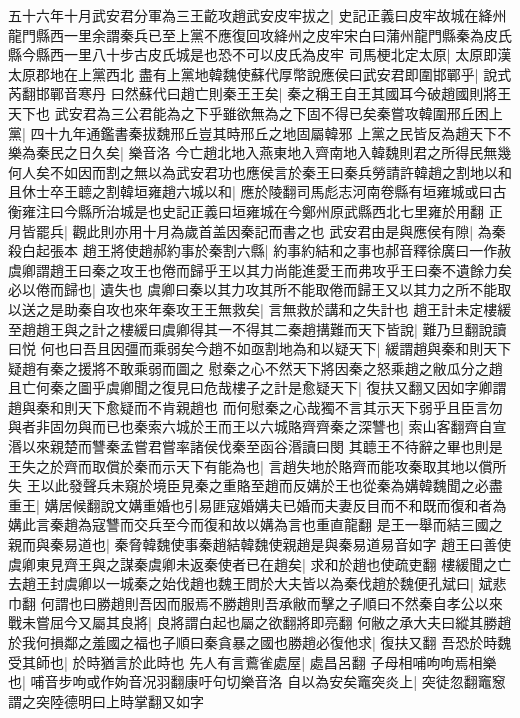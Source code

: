 五十六年十月武安君分軍為三王齕攻趙武安皮牢拔之|{
	史記正義曰皮牢故城在絳州龍門縣西一里余謂秦兵已至上黨不應復回攻絳州之皮牢宋白曰蒲州龍門縣秦為皮氏縣今縣西一里八十步古皮氏城是也恐不可以皮氏為皮牢}
司馬梗北定太原|{
	太原即漢太原郡地在上黨西北}
盡有上黨地韓魏使蘇代厚幣說應侯曰武安君即圍邯鄲乎|{
	說式芮翻邯鄲音寒丹}
曰然蘇代曰趙亡則秦王王矣|{
	秦之稱王自王其國耳今破趙國則將王天下也}
武安君為三公君能為之下乎雖欲無為之下固不得已矣秦嘗攻韓圍邢丘困上黨|{
	四十九年通鑑書秦拔魏邢丘豈其時邢丘之地固屬韓邪}
上黨之民皆反為趙天下不樂為秦民之日久矣|{
	樂音洛}
今亡趙北地入燕東地入齊南地入韓魏則君之所得民無幾何人矣不如因而割之無以為武安君功也應侯言於秦王曰秦兵勞請許韓趙之割地以和且休士卒王聼之割韓垣雍趙六城以和|{
	應於陵翻司馬彪志河南卷縣有垣雍城或曰古衡雍注曰今縣所治城是也史記正義曰垣雍城在今鄭州原武縣西北七里雍於用翻}
正月皆罷兵|{
	觀此則亦用十月為歲首盖因秦記而書之也}
武安君由是與應侯有隙|{
	為秦殺白起張本}
趙王將使趙郝約事於秦割六縣|{
	約事約結和之事也郝音釋徐廣曰一作赦}
虞卿謂趙王曰秦之攻王也倦而歸乎王以其力尚能進愛王而弗攻乎王曰秦不遺餘力矣必以倦而歸也|{
	遺失也}
虞卿曰秦以其力攻其所不能取倦而歸王又以其力之所不能取以送之是助秦自攻也來年秦攻王王無救矣|{
	言無救於講和之失計也}
趙王計未定樓緩至趙趙王與之計之樓緩曰虞卿得其一不得其二秦趙搆難而天下皆說|{
	難乃旦翻說讀曰悦}
何也曰吾且因彊而乘弱矣今趙不如亟割地為和以疑天下|{
	緩謂趙與秦和則天下疑趙有秦之援將不敢乘弱而圖之}
慰秦之心不然天下將因秦之怒乘趙之敝瓜分之趙且亡何秦之圖乎虞卿聞之復見曰危哉樓子之計是愈疑天下|{
	復扶又翻又因如字卿謂趙與秦和則天下愈疑而不肯親趙也}
而何慰秦之心哉獨不言其示天下弱乎且臣言勿與者非固勿與而已也秦索六城於王而王以六城賂齊齊秦之深讐也|{
	索山客翻齊自宣湣以來親楚而讐秦孟嘗君嘗率諸侯伐秦至函谷湣讀曰閔}
其聼王不待辭之畢也則是王失之於齊而取償於秦而示天下有能為也|{
	言趙失地於賂齊而能攻秦取其地以償所失}
王以此發聲兵未窺於境臣見秦之重賂至趙而反媾於王也從秦為媾韓魏聞之必盡重王|{
	媾居候翻說文媾重婚也引易匪寇婚媾夫已婚而夫妻反目而不和既而復和者為媾此言秦趙為寇讐而交兵至今而復和故以媾為言也重直龍翻}
是王一舉而結三國之親而與秦易道也|{
	秦脅韓魏使事秦趙結韓魏使親趙是與秦易道易音如字}
趙王曰善使虞卿東見齊王與之謀秦虞卿未返秦使者已在趙矣|{
	求和於趙也使疏吏翻}
樓緩聞之亡去趙王封虞卿以一城秦之始伐趙也魏王問於大夫皆以為秦伐趙於魏便孔斌曰|{
	斌悲巾翻}
何謂也曰勝趙則吾因而服焉不勝趙則吾承敝而擊之子順曰不然秦自孝公以來戰未嘗屈今又屬其良將|{
	良將謂白起也屬之欲翻將即亮翻}
何敝之承大夫曰縱其勝趙於我何損鄰之羞國之福也子順曰秦貪暴之國也勝趙必復他求|{
	復扶又翻}
吾恐於時魏受其師也|{
	於時猶言於此時也}
先人有言鷰雀處屋|{
	處昌呂翻}
子母相哺呴呴焉相樂也|{
	哺音步呴或作姁音况羽翻康吁句切樂音洛}
自以為安矣竈突炎上|{
	突徒忽翻竈䆫謂之突陸德明曰上時掌翻又如字}
